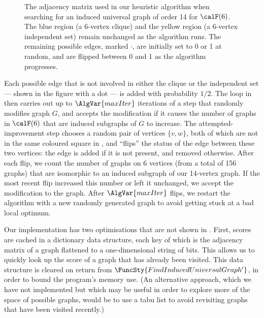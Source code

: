 \begin{figure}[h!]
    \centering
    \footnotesize
    \caption{The adjacency matrix used in our heuristic algorithm when searching
        for an induced universal graph of order 14 for $\calF(6)$.  The blue
        region (a 6-vertex clique) and the yellow region (a 6-vertex independent
        set) remain unchanged as the algorithm runs.  The remaining possible edges,
        marked $\boldsymbol{\cdot}$, are initially set to 0 or 1 at random,
        and are flipped between 0 and 1 as the algorithm progresses.}
\label{fig:heuristic-regions}
\end{figure}

Each possible edge that is not involved in either the clique or the independent
set --- shown in the figure with a dot --- is added with probability $1/2$.
The loop in  then carries out up to
$\AlgVar{maxIter}$ iterations of a step that randomly modifies graph $G$,
and accepts the modification if it causes the number of graphs in $\calF(6)$ that
are induced subgraphs of $G$ to increase.
The attempted-improvement step chooses a random pair of vertices $\{v, w\}$,
both of which are not in the same coloured square
in , and
``flips'' the status of the edge between these two vertices: the edge is added if it
is not present, and removed otherwise.
After each flip, we count the number of graphs on 6 vertices (from a total
of 156 graphs) that are
isomorphic to an induced subgraph of our 14-vertex graph.  If the most recent flip
increased this number or left it unchanged, we accept the modification
to the graph.  After $\AlgVar{maxIter}$
flips, we restart the algorithm with a new randomly generated graph to avoid
getting stuck at a bad local optimum.

Our implementation has two optimisations that are not shown in .
First, scores are cached in a dictionary data structure, each key of
which is the adjacency matrix of a graph flattened to a one-dimensional
string of bits.  This allows us to quickly look
up the score of a graph that has already been visited. This data structure is
cleared on return from $\FuncSty{FindInducedUniversalGraph'}$, in order to
bound the program's memory use.
(An alternative approach, which we have not implemented but which
may be useful in order to explore more of the space of possible graphs, would be to
use a tabu list \citep{DBLP:books/daglib/0093574} to avoid revisiting graphs
that have been visited recently.)

